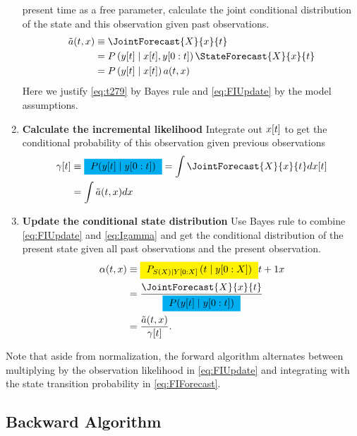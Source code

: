 \begin{enumerate}
  present time as a free parameter, calculate the joint conditional
  distribution of the state and this observation given past
  observations.
  \begin{align}
    \nonumber
  \tilde a(t,x) & \equiv \JointForecast{X}{x}{t} \\
  \label{eq:t279}
                &= P\left(\ti{y}{t}\given \ti{x}{t},\ts{y}{0}{t} \right)
  \StateForecast{X}{x}{t} \\
  \label{eq:FIUpdate}
  &=P\left(\ti{y}{t}\given \ti{x}{t} \right) a(t,x)
\end{align}
Here we justify \eqref{eq:t279} by Bayes rule and \eqref{eq:FIUpdate} by
the model assumptions.
\item \textbf{Calculate the incremental likelihood}
  Integrate out ${x}{[t]}$ to get the conditional probability of
  this observation given previous observations
  \begin{align}
    \nonumber
    \ti{\gamma}{t} &\equiv \gammax = \int
  \JointForecast{X}{x}{t} d\ti{x}{t} \\
    \label{eq:Igamma}
    &= \int \tilde a(t,x) dx
\end{align}
\item \textbf{Update the conditional state distribution}  Use
  Bayes rule to combine \eqref{eq:FIUpdate} and \eqref{eq:Igamma} and get
  the conditional distribution of the present state given all past
  observations and the present observation.
\begin{align}
  \alpha(t,x) &\equiv \alphax{X}{t}{t+1}{x} \\
  &=  \frac{ \JointForecast{X}{x}{t}}{\gammax}\\
  \label{eq:IUpdate}
  &= \frac{\tilde a(t,x)}{\ti{\gamma}{t}}.
\end{align}
\end{enumerate}
Note that aside from normalization, the forward algorithm alternates
between multiplying by the observation likelihood in
\eqref{eq:FIUpdate} and integrating with the state transition
probability in \eqref{eq:FIForecast}.

\subsection{Backward Algorithm}

